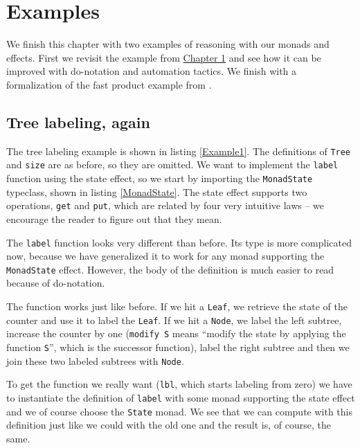 \documentclass[declaration,inz,english,shortabstract]{iithesis}
\newcommand{\m}[1]{\texttt{#1}}
\begin{document}

\section{Examples}

We finish this chapter with two examples of reasoning with our monads and effects. First we revisit the example from \hyperref[ch1]{Chapter 1} and see how it can be improved with do-notation and automation tactics. We finish with a formalization of the fast product example from \cite{JustDoIt}.

\subsection{Tree labeling, again}

The tree labeling example is shown in listing \ref{Example1}. The definitions of \m{Tree} and \m{size} are as before, so they are omitted. We want to implement the \m{label} function using the state effect, so we start by importing the \m{MonadState} typeclass, shown in listing \ref{MonadState}. The state effect supports two operations, \m{get} and \m{put}, which are related by four very intuitive laws -- we encourage the reader to figure out that they mean.

The \m{label} function looks very different than before. Its type is more complicated now, because we have generalized it to work for any monad supporting the \m{MonadState} effect. However, the body of the definition is much easier to read because of do-notation. 

The function works just like before. If we hit a \m{Leaf}, we retrieve the state of the counter and use it to label the \m{Leaf}. If we hit a \m{Node}, we label the left subtree, increase the counter by one (\m{modify S} means ``modify the state by applying the function \m{S}'', which is the successor function), label the right subtree and then we join these two labeled subtrees with \m{Node}.

To get the function we really want (\m{lbl}, which starts labeling from zero) we have to instantiate the definition of \m{label} with some monad supporting the state effect and we of course choose the \m{State} monad. We see that we can compute with this definition just like we could with the old one and the result is, of course, the same.
\end{document}
